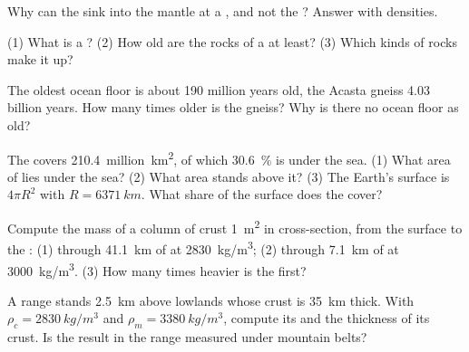 \begin{exercise}[$\star$]\label{exo:g12:continental-crust:3}
Why can the  sink into the mantle at a , and not
the ? Answer with densities.
\end{exercise}

\begin{exercise}[$\star$]\label{exo:g12:continental-crust:4}
(1) What is a ? (2) How old are the rocks of a  at least?
(3) Which kinds of rocks make it up?
\end{exercise}

\begin{exercise}[$\star$]\label{exo:g12:continental-crust:5}
The oldest ocean floor is about 190 million years old, the Acasta gneiss
4.03 billion years. How many times older is the gneiss? Why is there no
ocean floor as old?
\end{exercise}

\begin{exercise}[$\star\star$]\label{exo:g12:continental-crust:6}
The  covers \num{210.4}~million~\unit{km^2}, of which
\qty{30.6}{\percent} is under the sea. (1) What area of 
lies under the sea? (2) What area stands above it? (3) The Earth's surface is
$4\pi R^2$ with $R = \qty{6371}{km}$. What share of the surface does the
 cover?
\end{exercise}

\begin{exercise}[$\star\star$]\label{exo:g12:continental-crust:7}
Compute the mass of a column of crust \qty{1}{m^2} in cross-section,
from the surface to the : (1) through \qty{41.1}{km} of  at \qty{2830}{kg/m^3}; (2) through \qty{7.1}{km} of  at
\qty{3000}{kg/m^3}. (3) How many times heavier is the first?
\end{exercise}

\begin{exercise}[$\star\star$]\label{exo:g12:continental-crust:8}
A range stands \qty{2.5}{km} above lowlands whose crust is \qty{35}{km}
thick. With $\rho_c = \qty{2830}{kg/m^3}$ and $\rho_m =
\qty{3380}{kg/m^3}$, compute its  and the thickness of its crust. Is
the result in the range measured under mountain belts?
\end{exercise}

